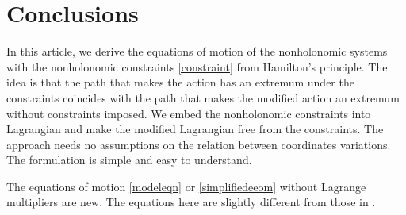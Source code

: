 \documentclass[preprint,11pt]{elsarticle}
\begin{document}
\section{Conclusions}
In this article, we derive the equations of motion of the nonholonomic systems with the nonholonomic constraints \eqref{constraint} from Hamilton's principle. The idea is that the path that makes the action has an extremum under the constraints coincides with the path that makes the modified action an extremum without constraints imposed. We embed the nonholonomic constraints into Lagrangian and make the modified Lagrangian free from the constraints.
The approach needs no assumptions on the relation between coordinates variations. The formulation is simple and easy to understand.

The equations of motion \eqref{modeleqn} or \eqref{simplifiedeeom} without Lagrange multipliers are new. The equations here are slightly different from those in \cite{Gao2005}.






\end{document}
